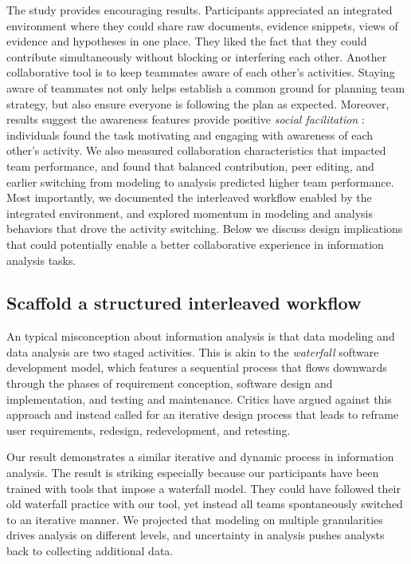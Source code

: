 The study provides encouraging results. Participants appreciated an integrated
environment where they could share raw documents, evidence snippets, views of
evidence and hypotheses in one place. They liked the fact that they could
contribute simultaneously without blocking or interfering each other. Another
collaborative tool is to keep teammates aware of each other's
activities. Staying aware of teammates not only helps establish a common ground
for planning team strategy, but also ensure everyone is following the plan as
expected. Moreover, results suggest the awareness features provide positive
\emph{social facilitation} \citep{Zajonc1965}: individuals found the task
motivating and engaging with awareness of each other's activity. We also
measured collaboration characteristics that impacted team performance, and found
that balanced contribution, peer editing, and earlier switching from modeling to
analysis predicted higher team performance. Most importantly, we documented the
interleaved workflow enabled by the integrated environment, and explored
momentum in modeling and analysis behaviors that drove the activity switching.
Below we discuss design implications that could potentially enable a better
collaborative experience in information analysis tasks.

\subsection{Scaffold a structured interleaved workflow}

An typical misconception about information analysis is that data modeling and
data analysis are two staged activities. This is akin to the \emph{waterfall}
software development model, which features a sequential process that
flows downwards through the phases of requirement conception, software
design and implementation, and testing and maintenance. Critics have
argued against this approach and instead called for an iterative design
process that leads to reframe user requirements,
redesign, redevelopment, and retesting.

Our result demonstrates a similar iterative and dynamic process in information
analysis. The result is striking especially because our participants have been
trained with tools that impose a waterfall model. They could have followed their
old waterfall practice with our tool, yet instead all teams spontaneously
switched to an iterative manner. We projected that modeling on multiple granularities drives analysis on different levels, and uncertainty in analysis pushes analysts back to collecting additional data.

